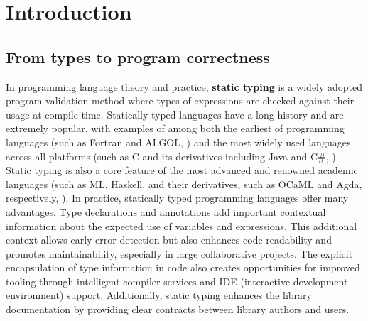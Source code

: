 
\chapter{Introduction}

\label{intro} 

\graphicspath{{Figures/Introduction}}

\section{From types to program correctness}

In programming language theory and practice, \textbf{static typing} is a widely adopted program validation method where types of expressions are checked against their usage at compile time. Statically typed languages have a long history and are extremely popular, with examples of among both the earliest of programming languages (such as Fortran and ALGOL, \cite{Backus1978-xt}) and the most widely used languages across all platforms  (such as C and its derivatives including Java and C\#, \cite{Ritchie1978-pa}). Static typing is also a core feature of the most advanced and renowned academic languages (such as ML, Haskell, and their derivatives, such as OCaML and Agda, respectively, \cite{Hudak2007-kn}). In practice, statically typed programming languages offer many advantages. Type declarations and annotations add important contextual information about the expected use of variables and expressions. This additional context allows early error detection but also enhances code readability and promotes maintainability, especially in large collaborative projects. The explicit encapsulation of type information in code also creates opportunities for improved tooling through intelligent compiler services and IDE (interactive development environment) support. Additionally, static typing enhances the library documentation by providing clear contracts between library authors and users.

